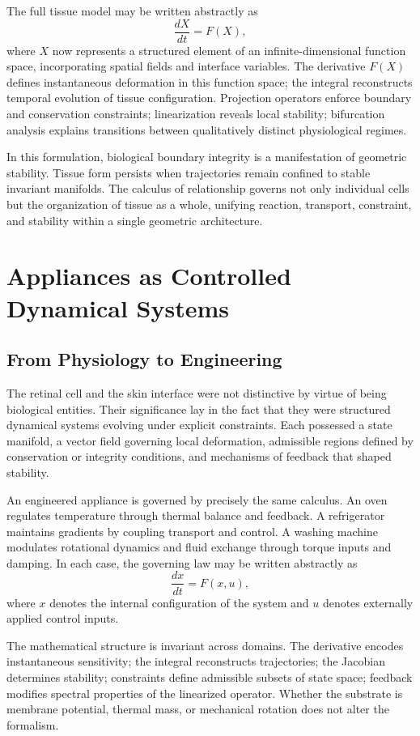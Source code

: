 \documentclass[12pt]{book}
\begin{document}
The full tissue model may be written abstractly as
\[
\frac{dX}{dt} = F(X),
\]
where $X$ now represents a structured element of an
infinite-dimensional function space, incorporating spatial fields and
interface variables. The derivative $F(X)$ defines instantaneous
deformation in this function space; the integral reconstructs temporal
evolution of tissue configuration. Projection operators enforce
boundary and conservation constraints; linearization reveals local
stability; bifurcation analysis explains transitions between
qualitatively distinct physiological regimes.

In this formulation, biological boundary integrity is a manifestation
of geometric stability. Tissue form persists when trajectories remain
confined to stable invariant manifolds. The calculus of relationship
governs not only individual cells but the organization of tissue as a
whole, unifying reaction, transport, constraint, and stability within
a single geometric architecture.

\chapter{Appliances as Controlled Dynamical Systems}

\section{From Physiology to Engineering}

The retinal cell and the skin interface were not distinctive by virtue
of being biological entities. Their significance lay in the fact that
they were structured dynamical systems evolving under explicit
constraints. Each possessed a state manifold, a vector field governing
local deformation, admissible regions defined by conservation or
integrity conditions, and mechanisms of feedback that shaped
stability.

An engineered appliance is governed by precisely the same calculus.
An oven regulates temperature through thermal balance and feedback.
A refrigerator maintains gradients by coupling transport and control.
A washing machine modulates rotational dynamics and fluid exchange
through torque inputs and damping. In each case, the governing law
may be written abstractly as
\[
\frac{dx}{dt} = F(x,u),
\]
where $x$ denotes the internal configuration of the system and
$u$ denotes externally applied control inputs.

The mathematical structure is invariant across domains. The derivative
encodes instantaneous sensitivity; the integral reconstructs
trajectories; the Jacobian determines stability; constraints define
admissible subsets of state space; feedback modifies spectral
properties of the linearized operator. Whether the substrate is
membrane potential, thermal mass, or mechanical rotation does not
alter the formalism.
\end{document}
